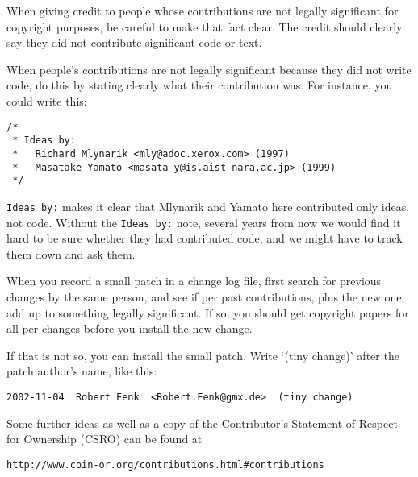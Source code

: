 When giving credit to people whose contributions are not legally significant for copyright purposes, be careful to make that fact clear. The credit should clearly say they did not contribute significant code or text.
 
When people’s contributions are not legally significant because they did not write code, do this by stating clearly what their contribution was. For instance, you could write this:
 
\begin{verbatim}
/*
 * Ideas by:
 *   Richard Mlynarik <mly@adoc.xerox.com> (1997)
 *   Masatake Yamato <masata-y@is.aist-nara.ac.jp> (1999)
 */
\end{verbatim}

{\tt Ideas by:} makes it clear that Mlynarik and Yamato here contributed only ideas, not code. 
Without the {\tt Ideas by:} note, several years from now we would find it hard to be sure whether they had contributed code, and we might have to track them down and ask them.
 
When you record a small patch in a change log file, first search for previous changes by the same person, and see if per past contributions, plus the new one, add up to something legally significant. If so, you should get copyright papers for all per changes before you install the new change.
 
If that is not so, you can install the small patch. Write `(tiny change)' after the patch author's name, like this:
 
\begin{verbatim}
2002-11-04  Robert Fenk  <Robert.Fenk@gmx.de>  (tiny change)
\end{verbatim}

\medskip

Some further ideas as well as a copy of the Contributor's Statement of Respect for Ownership (CSRO)
can be found at %
\begin{verbatim}
http://www.coin-or.org/contributions.html#contributions
\end{verbatim}
